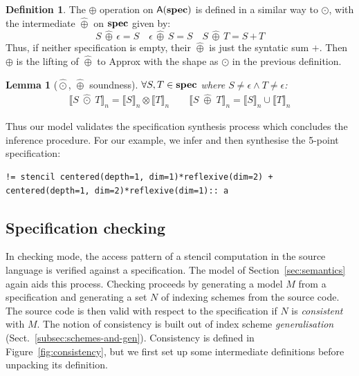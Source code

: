\documentclass[9pt]{sigplanconf}
\newcounter{block}
\newtheorem{lemma}[block]{Lemma}
\theoremstyle{definition}
\newtheorem{definition}[block]{Definition}
\newcommand{\interp}[1]{\llbracket{#1}\rrbracket}
\newcommand{\term}[1]{\texttt{#1}}
\begin{document}
\begin{definition}The $\oplus$ operation on $\textsf{A}(\textbf{spec})$ 
is defined in a similar way to $\odot$, with the intermediate $\hat{\oplus}$ on
$\textbf{spec}$ given by:
\begin{equation*}
S \,\hat{\oplus}\, \epsilon = S \quad
\epsilon \,\hat{\oplus}\, S = S \quad
S \, \hat{\oplus} \, T = S \, \term{+} \, T
\end{equation*}
Thus, if neither specification is empty, their $\hat{\oplus}$ is just
the syntatic sum $\term{+}$. Then $\oplus$ is the lifting of
$\hat{\oplus}$ to \textsf{Approx} with the shape as $\odot$ in the previous
definition.
\end{definition}

\begin{lemma}[$\hat{\odot}$, $\hat{\oplus}$ soundness] $\forall S,
  T \in \textbf{spec}$ where $S \neq \epsilon \wedge T \neq \epsilon$:
\begin{align*}
\interp{S \; \hat{\odot} \; T}_n = \interp{S}_n \otimes \interp{T}_n
  \qquad
\interp{S \; \hat{\oplus} \; T}_n = \interp{S}_n \cup \interp{T}_n
\end{align*}
\label{lem:alg-soundness}
\vspace{-2em}
\end{lemma}
%
\noindent
Thus our model validates the specification synthesis process which concludes the
inference procedure. For our example, we infer and then synthesise the
5-point specification:
\begin{verbatim}
!= stencil centered(depth=1, dim=1)*reflexive(dim=2) + centered(depth=1, dim=2)*reflexive(dim=1):: a
\end{verbatim}

\subsection{Specification checking\label{subsec:checking}}

In checking mode, the access pattern of a stencil computation in the
source language is verified against a specification. The model of
Section~\ref{sec:semantics} again aids this process.  Checking
proceeds by generating a model $M$ from a specification and generating a set $N$ of indexing
schemes from the source code. The source code is then valid with
respect to the specification if $N$ is \emph{consistent} with $M$. The
notion of consistency is built out of index scheme 
\emph{generalisation} (Sect.~\ref{subsec:schemes-and-gen}). 
Consistency is defined in Figure~\ref{fig:consistency},
but we first set up some intermediate definitions before unpacking its definition.
\end{document}

